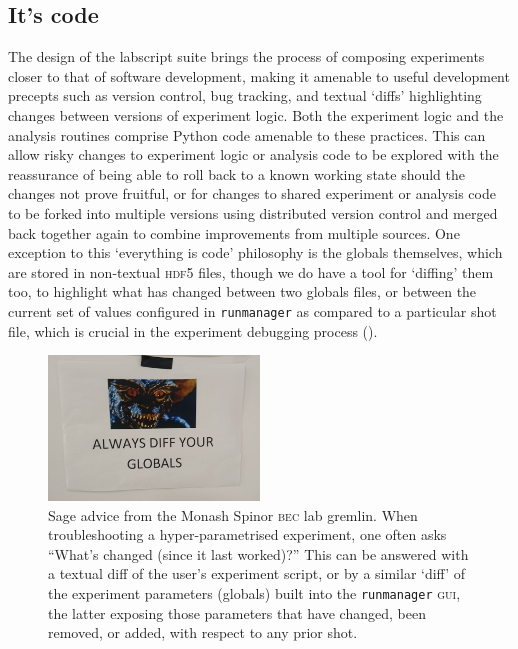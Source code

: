 \subsection{It's code}\label{sec:its_code}
The design of the labscript suite brings the process of composing experiments closer to that of software development, making it amenable to useful development precepts such as version control, bug tracking, and textual `diffs' highlighting changes between versions of experiment logic. Both the experiment logic and the analysis routines comprise Python code amenable to these practices. This can allow risky changes to experiment logic or analysis code to be explored with the reassurance of being able to roll back to a known working state should the changes not prove fruitful, or for changes to shared experiment or analysis code to be forked into multiple versions using distributed version control and merged back together again to combine improvements from multiple sources. One exception to this `everything is code' philosophy is the globals themselves, which are stored in non-textual \textsc{hdf5} files, though we do have a tool for `diffing' them too, to highlight what has changed between two globals files, or between the current set of values configured in \texttt{runmanager} as compared to a particular shot file, which is crucial in the experiment debugging process ().

\begin{figure}
\begin{center}
\includegraphics[width=0.5\textwidth]{figures/software/globals_diff.png}
\caption{Sage advice from the Monash Spinor \textsc{bec} lab gremlin. When troubleshooting a hyper-parametrised experiment, one often asks ``What's changed (since it last worked)?'' This can be answered with a textual diff of the user's experiment script, or by a similar `diff' of the experiment parameters (globals) built into the \texttt{runmanager} \textsc{gui}, the latter exposing those parameters that have changed, been removed, or added, with respect to any prior shot.}\label{fig:globals_diff}
\end{center}
\end{figure}


